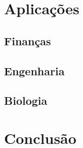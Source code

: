 \documentclass[12pt, a4paper]{article}
\begin{document}
\section{Aplicações}

\subsection{Finanças}

\subsection{Engenharia}

\subsection{Biologia}

\section{Conclusão}
\end{document}
